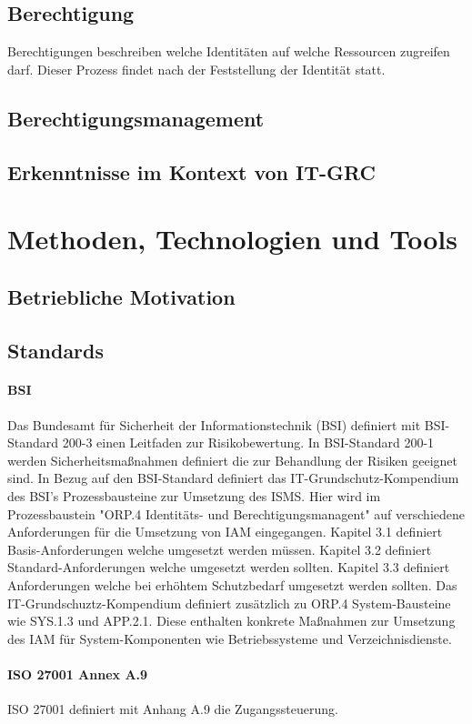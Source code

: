 \documentclass[10pt]{article}
\begin{document}
\subsection{Berechtigung}
Berechtigungen beschreiben welche Identitäten auf welche Ressourcen zugreifen darf. Dieser Prozess findet nach der Feststellung der Identität statt.
\subsection{Berechtigungsmanagement}
\subsection{Erkenntnisse im Kontext von IT-GRC}
\section{Methoden, Technologien und Tools}
\label{sec:existing}
\subsection{Betriebliche Motivation}
\subsection{Standards}
\paragraph{BSI}
Das Bundesamt für Sicherheit der Informationstechnik (BSI) definiert mit BSI-Standard 200-3 einen Leitfaden zur Risikobewertung. In BSI-Standard 200-1 werden Sicherheitsmaßnahmen definiert die zur Behandlung der Risiken geeignet sind. In Bezug auf den BSI-Standard definiert das IT-Grundschutz-Kompendium des BSI's Prozessbausteine zur Umsetzung des ISMS. Hier wird im Prozessbaustein "ORP.4 Identitäts- und Berechtigungsmanagent" auf verschiedene Anforderungen für die Umsetzung von IAM eingegangen. Kapitel 3.1 definiert Basis-Anforderungen welche umgesetzt werden müssen. Kapitel 3.2 definiert Standard-Anforderungen welche umgesetzt werden sollten. Kapitel 3.3 definiert Anforderungen welche bei erhöhtem Schutzbedarf umgesetzt werden sollten. Das IT-Grundschuztz-Kompendium definiert zusätzlich zu ORP.4 System-Bausteine wie SYS.1.3 und APP.2.1. Diese enthalten konkrete Maßnahmen zur Umsetzung des IAM für System-Komponenten wie Betriebssysteme und Verzeichnisdienste.
\paragraph{ISO 27001 Annex A.9}
ISO 27001 definiert mit Anhang A.9 die Zugangssteuerung.
\end{document}
